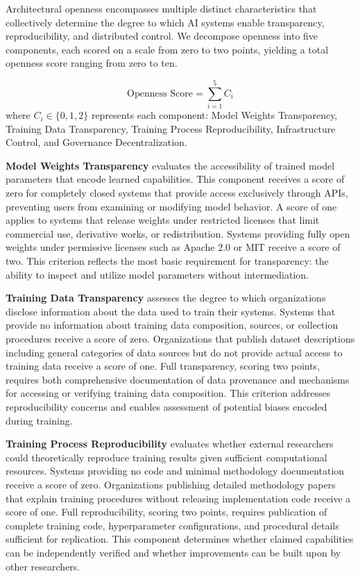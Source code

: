 Architectural openness encompasses multiple distinct characteristics that collectively determine the degree to which AI systems enable transparency, reproducibility, and distributed control. We decompose openness into five components, each scored on a scale from zero to two points, yielding a total openness score ranging from zero to ten.

\begin{equation}
\text{Openness Score} = \sum_{i=1}^{5} C_i
\end{equation}
where $C_i \in \{0, 1, 2\}$ represents each component: Model Weights Transparency, Training Data Transparency, Training Process Reproducibility, Infrastructure Control, and Governance Decentralization.


\textbf{Model Weights Transparency} evaluates the accessibility of trained model parameters that encode learned capabilities. This component receives a score of zero for completely closed systems that provide access exclusively through APIs, preventing users from examining or modifying model behavior. A score of one applies to systems that release weights under restricted licenses that limit commercial use, derivative works, or redistribution. Systems providing fully open weights under permissive licenses such as Apache 2.0 or MIT receive a score of two. This criterion reflects the most basic requirement for transparency: the ability to inspect and utilize model parameters without intermediation.

\textbf{Training Data Transparency} assesses the degree to which organizations disclose information about the data used to train their systems. Systems that provide no information about training data composition, sources, or collection procedures receive a score of zero. Organizations that publish dataset descriptions including general categories of data sources but do not provide actual access to training data receive a score of one. Full transparency, scoring two points, requires both comprehensive documentation of data provenance and mechanisms for accessing or verifying training data composition. This criterion addresses reproducibility concerns and enables assessment of potential biases encoded during training.

\textbf{Training Process Reproducibility} evaluates whether external researchers could theoretically reproduce training results given sufficient computational resources. Systems providing no code and minimal methodology documentation receive a score of zero. Organizations publishing detailed methodology papers that explain training procedures without releasing implementation code receive a score of one. Full reproducibility, scoring two points, requires publication of complete training code, hyperparameter configurations, and procedural details sufficient for replication. This component determines whether claimed capabilities can be independently verified and whether improvements can be built upon by other researchers.

